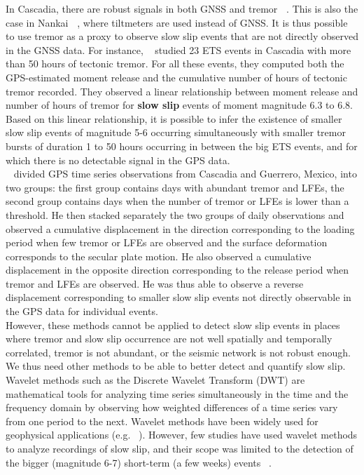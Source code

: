 \documentclass{article}
\begin{document}
In Cascadia, there are robust signals in both GNSS and tremor \textbf{~\citep{HAW_2013}}. This is also the case in Nankai \textbf{~\citep{HIR_2008}}, where tiltmeters are used instead of GNSS. It is thus possible to use tremor as a proxy to observe slow slip events that are not directly observed in the GNSS data. For instance, ~\citet{AGU_2009} studied 23 ETS events in Cascadia with more than 50 hours of tectonic tremor. For all these events, they computed both the GPS-estimated moment release and the cumulative number of hours of tectonic tremor recorded. They observed a linear relationship between moment release and number of hours of tremor for \textbf{slow slip} events of moment magnitude 6.3 to 6.8. Based on this linear relationship, it is possible to infer the existence of smaller slow slip events of magnitude 5-6 occurring simultaneously with smaller tremor bursts of duration 1 to 50 hours occurring in between the big ETS events, and for which there is no detectable signal in the GPS data. \\

~\citet{FRA_2016} divided GPS time series observations from Cascadia and Guerrero, Mexico, into two groups: the first group contains days with abundant tremor and LFEs, the second group contains days when the number of tremor or LFEs is lower than a threshold. He then stacked separately the two groups of daily observations and observed a cumulative displacement in the direction corresponding to the loading period when few tremor or LFEs are observed and the surface deformation corresponds to the secular plate motion. He also observed a cumulative displacement in the opposite direction corresponding to the release period when tremor and LFEs are observed. He was thus able to observe a reverse displacement corresponding to smaller slow slip events not directly observable in the GPS data for individual events. \\

However, these methods cannot be applied to detect slow slip events in places where tremor and slow slip occurrence are not well spatially and temporally correlated, tremor is not abundant, or the seismic network is not robust enough. We thus need other methods to be able to better detect and quantify slow slip. \\

Wavelet methods such as the Discrete Wavelet Transform (DWT) are mathematical tools for analyzing time series simultaneously in the time and the frequency domain by observing how weighted differences of a time series vary from one period to the next. Wavelet methods have been widely used for geophysical applications (e.g. ~\citet{KUM_1997}). However, few studies have used wavelet methods to analyze recordings of slow slip, and their scope was limited to the detection of the bigger (magnitude 6-7) short-term (a few weeks) events ~\citep{SZE_2008,OHT_2010,WEI_2012,ALB_2019}. \\
\end{document}
